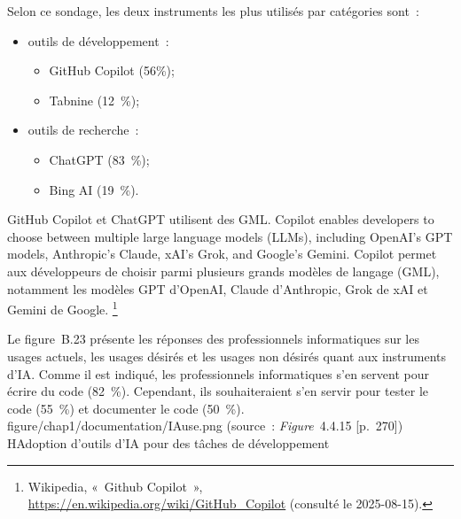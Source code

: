 {Selon ce sondage, les deux instruments les plus utilisés par catégories sont~:
\begin{itemize}
    \item outils de développement~:
    \begin{itemize}
        \item GitHub Copilot (56\%); 
        \item Tabnine (12~\%);
    \end{itemize}
    \item outils de recherche~:
        \begin{itemize}
        \item ChatGPT (83~\%);
        \item Bing AI (19~\%).
    \end{itemize}
\end{itemize}
GitHub Copilot et ChatGPT utilisent des GML. 
\quoteenfr
{Copilot enables developers to choose between multiple large language models (LLMs), including OpenAI's GPT models, Anthropic's Claude, xAI's Grok, and Google's Gemini.}
{Copilot permet aux développeurs de choisir parmi plusieurs grands modèles de langage (GML), notamment les modèles GPT d'OpenAI, Claude d'Anthropic, Grok de xAI et Gemini de Google.}
{\footnote{Wikipedia, «~Github Copilot~», \url{https://en.wikipedia.org/wiki/GitHub_Copilot} (consulté le 2025-08-15).}}

Le figure~B.23 présente les réponses des professionnels informatiques sur les usages actuels, les usages désirés et les usages non désirés quant aux instruments d'IA. Comme il est indiqué, les professionnels informatiques s'en servent pour écrire du code (82~\%). Cependant, ils souhaiteraient s'en servir pour tester le code (55~\%) et documenter le code (50~\%). 
\figen
{}
{figure/chap1/documentation/IAuse.png}
{(source~: \textit{Figure}~4.4.15 [p.~270])}
{}{}{H}{Adoption d'outils d'IA pour des tâches de développement}
}{}

